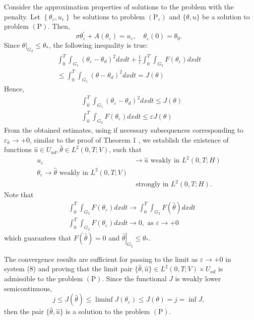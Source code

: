 \documentclass[10pt]{article}
\begin{document}
Consider the approximation properties of solutions to the problem with the penalty. Let $\left\{\theta_{\varepsilon}, u_{\varepsilon}\right\}$ be solutions to problem $\left(\mathrm{P}_{\varepsilon}\right)$ and $\{\theta, u\}$ be a solution to problem $(\mathrm{P})$. Then,
$$
\sigma \theta_{\varepsilon}^{\prime}+A\left(\theta_{\varepsilon}\right)=u_{\varepsilon}, \quad \theta_{\varepsilon}(0)=\theta_{0} .
$$
Since $\left.\theta\right|_{G_{2}} \leq \theta_{*}$, the following inequality is true:
$$
\begin{array}{r}
\int_{0}^{T} \int_{G_{1}}\left(\theta_{\varepsilon}-\theta_{d}\right)^{2} d x d t+\frac{1}{\varepsilon} \int_{0}^{T} \int_{G_{2}} F\left(\theta_{\varepsilon}\right) d x d t \\
\leq \int_{0}^{T} \int_{G_{1}}\left(\theta-\theta_{d}\right)^{2} d x d t=J(\theta)
\end{array}
$$
Hence,
$$
\begin{aligned}
&\int_{0}^{T} \int_{G_{1}}\left(\theta_{\varepsilon}-\theta_{d}\right)^{2} d x d t \leq J(\theta) \\
&\int_{0}^{T} \int_{G_{2}} F\left(\theta_{\varepsilon}\right) d x d t \leq \varepsilon J(\theta)
\end{aligned}
$$
From the obtained estimates, using if necessary subsequences corresponding to $\varepsilon_{k} \rightarrow+0$, similar to the proof of Theorem 1 , we establish the existence of functions $\widehat{u} \in U_{a d}, \widehat{\theta} \in L^{2}(0, T ; V)$, such that
$$
\begin{aligned}
u_{\varepsilon} & \rightarrow \widehat{u} \text { weakly in } L^{2}(0, T ; H) \\
\theta_{\varepsilon} \rightarrow \widehat{\theta} \text { weakly in } L^{2}(0, T ; V) \\
& \text { strongly in } L^{2}(0, T ; H) .
\end{aligned}
$$
Note that
$$
\begin{aligned}
&\int_{0}^{T} \int_{G_{2}} F\left(\theta_{\varepsilon}\right) d x d t \rightarrow \int_{0}^{T} \int_{G_{2}} F(\widehat{\theta}) d x d t \\
&\int_{0}^{T} \int_{G_{2}} F\left(\theta_{\varepsilon}\right) d x d t \rightarrow 0, \text { as } \varepsilon \rightarrow+0
\end{aligned}
$$
which guarantees that $F(\widehat{\theta})=0$ and $\left.\widehat{\theta}\right|_{G_{2}} \leq \theta_{*}$.

The convergence results are sufficient for passing to the limit as $\varepsilon \rightarrow+0$ in system (8) and proving that the limit pair $\{\widehat{\theta}, \widehat{u}\} \in L^{2}(0, T ; V) \times U_{a d}$ is admissible to the problem $(\mathrm{P})$. Since the functional $J$ is weakly lower semicontinuous,
$$
j \leq J(\widehat{\theta}) \leq \liminf J\left(\theta_{\varepsilon}\right) \leq J(\theta)=j=\inf J,
$$
then the pair $\{\widehat{\theta}, \widehat{u}\}$ is a solution to the problem $(\mathrm{P})$.
\end{document}
